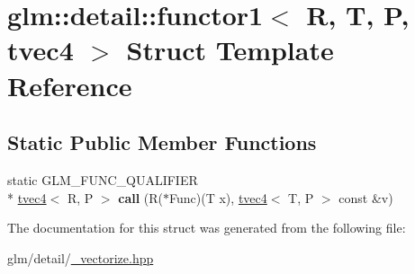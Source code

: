 \hypertarget{structglm_1_1detail_1_1functor1_3_01R_00_01T_00_01P_00_01tvec4_01_4}{\section{glm\-:\-:detail\-:\-:functor1$<$ R, T, P, tvec4 $>$ Struct Template Reference}
\label{structglm_1_1detail_1_1functor1_3_01R_00_01T_00_01P_00_01tvec4_01_4}
}
\subsection*{Static Public Member Functions}
\begin{DoxyCompactItemize}
\item 
\hypertarget{structglm_1_1detail_1_1functor1_3_01R_00_01T_00_01P_00_01tvec4_01_4_a65634749e4ae6e35d4cc898481d4681f}{static G\-L\-M\-\_\-\-F\-U\-N\-C\-\_\-\-Q\-U\-A\-L\-I\-F\-I\-E\-R \\*
\hyperlink{structglm_1_1tvec4}{tvec4}$<$ R, P $>$ {\bfseries call} (R($\ast$Func)(T x), \hyperlink{structglm_1_1tvec4}{tvec4}$<$ T, P $>$ const \&v)}\label{structglm_1_1detail_1_1functor1_3_01R_00_01T_00_01P_00_01tvec4_01_4_a65634749e4ae6e35d4cc898481d4681f}

\end{DoxyCompactItemize}


The documentation for this struct was generated from the following file\-:\begin{DoxyCompactItemize}
\item 
glm/detail/\hyperlink{__vectorize_8hpp}{\-\_\-vectorize.\-hpp}\end{DoxyCompactItemize}
